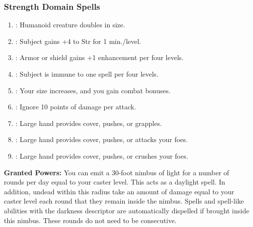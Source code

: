 \subsubsection{Strength Domain Spells}
\begin{enumerate}
	\item{:} Humanoid creature doubles in size.
	\item{:} Subject gains +4 to Str for 1 min./level.
	\item{:} Armor or shield gains +1 enhancement per four levels.
	\item{:} Subject is immune to one spell per four levels.
	\item{:} Your size increases, and you gain combat bonuses.
	\item{:} Ignore 10 points of damage per attack.
	\item{:} Large hand provides cover, pushes, or grapples.
	\item{:} Large hand provides cover, pushes, or attacks your foes.
	\item{:} Large hand provides cover, pushes, or crushes your foes.
\end{enumerate}

\textbf{Granted Powers:} You can emit a 30-foot nimbus of light for a number of rounds per day equal to your caster level. This acts as a daylight spell. In addition, undead within this radius take an amount of damage equal to your caster level each round that they remain inside the nimbus. Spells and spell-like abilities with the darkness descriptor are automatically dispelled if brought inside this nimbus. These rounds do not need to be consecutive.
